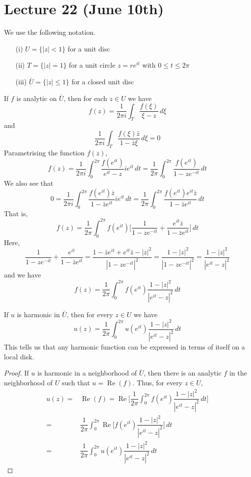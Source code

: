 \section{Lecture 22 (June 10th)}
\begin{rmk}
We use the following notation. 
\begin{itemize}
\item[(i)] $U=\{|z|<1\}$ for a unit disc
\item[(ii)] $T=\{|z|=1\}$ for a unit circle $z=re^{it}$ with $0\leq t\leq 2\pi $
\item[(iii)] $\bar{U}=\{|z|\leq 1 \}$ for a closed unit disc
\end{itemize}
\end{rmk}
\vspace{2ex}
\begin{lem}
If $f$ is analytic on $\bar{U}$, then for each $z\in U$ we have 
\[f(z)=\dfrac{1}{2\pi i}\int _{T}\dfrac{f(\xi )}{\xi -z}\,d\xi \]
and 
\[\dfrac{1}{2\pi i}\int _{T}\dfrac{f(\xi )\bar{z}}{1-\bar{z}\xi }\,d\xi =0\]
Parametrising the function $f(z)$,
\[f(z)=\dfrac{1}{2\pi i}\int ^{2\pi }_{0}\dfrac{f(e^{it})}{e^{it}-z}ie^{it}\,dt=\dfrac{1}{2\pi }\int ^{2\pi }_{0}\dfrac{f(e^{it})}{1-ze^{-it}}\,dt\]
We also see that
\[0=\dfrac{1}{2\pi i}\int ^{2\pi }_{0}\dfrac{f(e^{it})\bar{z}}{1-\bar{z}e^{it}}ie^{it}\,dt=\dfrac{1}{2\pi }\int ^{2\pi }_{0}\dfrac{f(e^{it})e^{it}\bar{z}}{1-\bar{z}e^{it}}\,dt\]
That is,
\[f(z)=\dfrac{1}{2\pi }\int ^{2\pi }_{0}f(e^{it})\Big[\dfrac{1}{1-ze^{-it}}+\dfrac{e^{it}\bar{z}}{1-\bar{z}e^{it}}\Big]\,dt\]
Here,
\[\dfrac{1}{1-ze^{-it}}+\dfrac{e^{it}}{1-\bar{z}e^{it}}=\dfrac{1-\bar{z}e^{it}+e^{it}\bar{z}-|z|^2}{|1-ze^{-it}|^2}=\dfrac{1-|z|^2}{|1-ze^{-it}|^2}=\dfrac{1-|z|^2}{|e^{it}-z|^2}\]
and we have
\[f(z)=\dfrac{1}{2\pi }\int ^{2\pi }_{0}f(e^{it})\dfrac{1-|z|^2}{|e^{it}-z|^2}\,dt\]
\end{lem}
\vspace{2ex}
\begin{thm}
If $u$ is harmonic in $\bar{U}$, then for every $z\in U$ we have
\[u(z)=\dfrac{1}{2\pi }\int ^{2\pi }_{0}u(e^{it})\dfrac{1-|z|^2}{|e^{it}-z|^2}\,dt\]
This tells us that any harmonic function can be expressed in terms of itself on a local disk.
\end{thm}
\vspace{2ex}
\begin{proof}
If $u$ is harmonic in a neighborhood of $\bar{U}$, then there is an analytic $f$ in the neighborhood of $U$ such that $u=\mathop{\mathrm{Re}}(f)$. Thus, for every $z\in U$,
\begin{align*}
u(z)=&\mathop{\mathrm{Re}}(f)=\mathop{\mathrm{Re}}\Big[\dfrac{1}{2\pi }\int ^{2\pi }_{0}f(e^{it})\dfrac{1-|z|^2}{|e^{it}-z|^2}\,dt\Big]\\
=&\dfrac{1}{2\pi }\int ^{2\pi }_{0}\mathop{\mathrm{Re}}\Big[f(e^{it})\dfrac{1-|z|^2}{|e^{it}-z|^2}\Big]\,dt
\\=&\dfrac{1}{2\pi }\int ^{2\pi }_{0}u(e^{it})\dfrac{1-|z|^2}{|e^{it}-z|^2}\,dt
\end{align*}
\end{proof}

